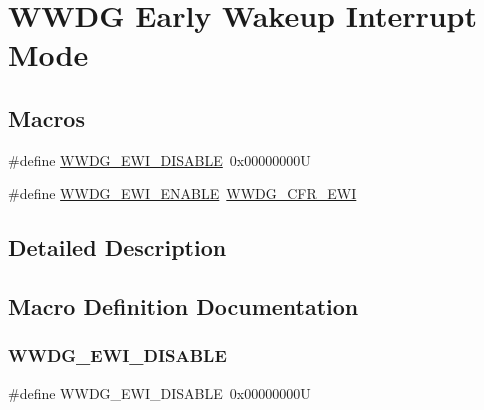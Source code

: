 \hypertarget{group___w_w_d_g___e_w_i___mode}{}\section{W\+W\+DG Early Wakeup Interrupt Mode}
\label{group___w_w_d_g___e_w_i___mode}
\subsection*{Macros}
\begin{DoxyCompactItemize}
\item 
\#define \hyperlink{group___w_w_d_g___e_w_i___mode_ga4160906c5c524a9a1e1f3b133ff01787}{W\+W\+D\+G\+\_\+\+E\+W\+I\+\_\+\+D\+I\+S\+A\+B\+LE}~0x00000000U
\item 
\#define \hyperlink{group___w_w_d_g___e_w_i___mode_gafd085306f139468934c6b9b22ea6e82b}{W\+W\+D\+G\+\_\+\+E\+W\+I\+\_\+\+E\+N\+A\+B\+LE}~\hyperlink{group___peripheral___registers___bits___definition_ga931941dc5d795502371ac5dd8fbac1e9}{W\+W\+D\+G\+\_\+\+C\+F\+R\+\_\+\+E\+WI}
\end{DoxyCompactItemize}


\subsection{Detailed Description}


\subsection{Macro Definition Documentation}
\mbox{\label{group___w_w_d_g___e_w_i___mode_ga4160906c5c524a9a1e1f3b133ff01787}} 
\subsubsection{\texorpdfstring{W\+W\+D\+G\+\_\+\+E\+W\+I\+\_\+\+D\+I\+S\+A\+B\+LE}{WWDG\_EWI\_DISABLE}}
{\footnotesize\ttfamily \#define W\+W\+D\+G\+\_\+\+E\+W\+I\+\_\+\+D\+I\+S\+A\+B\+LE~0x00000000U}

